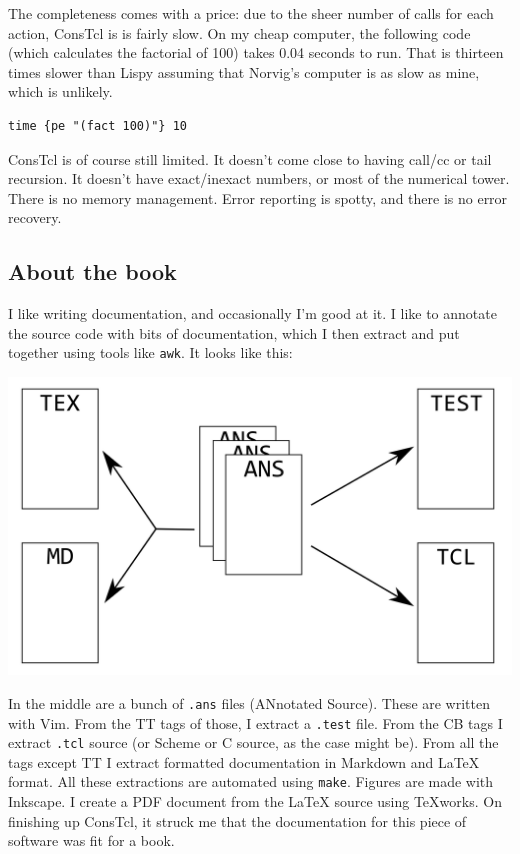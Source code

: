 \documentclass[a5paper,draft]{memoir}
\begin{document}
The completeness comes with a price: due to the sheer number of calls for each
action, ConsTcl is is fairly slow. On my cheap computer, the following code
(which calculates the factorial of 100) takes 0.04 seconds to run. That is thirteen
times slower than Lispy assuming that Norvig's computer is as slow as mine,
which is unlikely.

\begin{verbatim}
time {pe "(fact 100)"} 10
\end{verbatim}

ConsTcl is of course still limited. It doesn't come close to having call/cc or
tail recursion. It doesn't have exact/inexact numbers, or most of the numerical
tower. There is no memory management. Error reporting is spotty, and there is no
error recovery.

\subsection{About the book}
\label{about-the-book}


I like writing documentation, and occasionally I'm good at it. I like to
annotate the source code with bits of documentation, which I then extract and
put together using tools like \texttt{awk}. It looks like this:

\includegraphics{images/document.png}

In the middle are a bunch of \texttt{.ans} files (ANnotated Source). These are
written with Vim. From the TT tags of those, I extract a \texttt{.test} file.
From the CB tags I extract \texttt{.tcl} source (or Scheme or C source, as the
case might be). From all the tags except TT I extract formatted documentation
in Markdown and \LaTeX{} format. All these extractions are automated using
\texttt{make}.  Figures are made with Inkscape.  I create a PDF document from
the \LaTeX{} source using TeXworks. On finishing up ConsTcl, it struck me that
the documentation for this piece of software was fit for a book.
\end{document}
